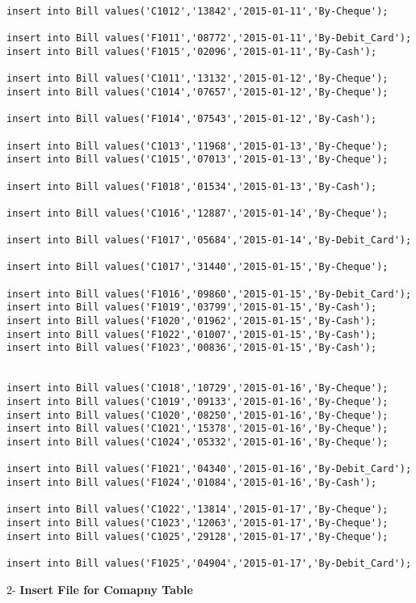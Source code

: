 \documentclass[a4,12pt]{report}
\begin{document}
\begin{lstlisting}
insert into Bill values('C1012','13842','2015-01-11','By-Cheque');

insert into Bill values('F1011','08772','2015-01-11','By-Debit_Card');
insert into Bill values('F1015','02096','2015-01-11','By-Cash');

insert into Bill values('C1011','13132','2015-01-12','By-Cheque');
insert into Bill values('C1014','07657','2015-01-12','By-Cheque');

insert into Bill values('F1014','07543','2015-01-12','By-Cash');

insert into Bill values('C1013','11968','2015-01-13','By-Cheque');
insert into Bill values('C1015','07013','2015-01-13','By-Cheque');

insert into Bill values('F1018','01534','2015-01-13','By-Cash');

insert into Bill values('C1016','12887','2015-01-14','By-Cheque');

insert into Bill values('F1017','05684','2015-01-14','By-Debit_Card');

insert into Bill values('C1017','31440','2015-01-15','By-Cheque');

insert into Bill values('F1016','09860','2015-01-15','By-Debit_Card');
insert into Bill values('F1019','03799','2015-01-15','By-Cash');
insert into Bill values('F1020','01962','2015-01-15','By-Cash');
insert into Bill values('F1022','01007','2015-01-15','By-Cash');
insert into Bill values('F1023','00836','2015-01-15','By-Cash');


insert into Bill values('C1018','10729','2015-01-16','By-Cheque');
insert into Bill values('C1019','09133','2015-01-16','By-Cheque');
insert into Bill values('C1020','08250','2015-01-16','By-Cheque');
insert into Bill values('C1021','15378','2015-01-16','By-Cheque');
insert into Bill values('C1024','05332','2015-01-16','By-Cheque');

insert into Bill values('F1021','04340','2015-01-16','By-Debit_Card');
insert into Bill values('F1024','01084','2015-01-16','By-Cash');

insert into Bill values('C1022','13814','2015-01-17','By-Cheque');
insert into Bill values('C1023','12063','2015-01-17','By-Cheque');
insert into Bill values('C1025','29128','2015-01-17','By-Cheque');

insert into Bill values('F1025','04904','2015-01-17','By-Debit_Card');
\end{lstlisting}


\begin{flushleft}
2- \textbf{Insert File for Comapny Table \\ }
\end{flushleft}
\end{document}
